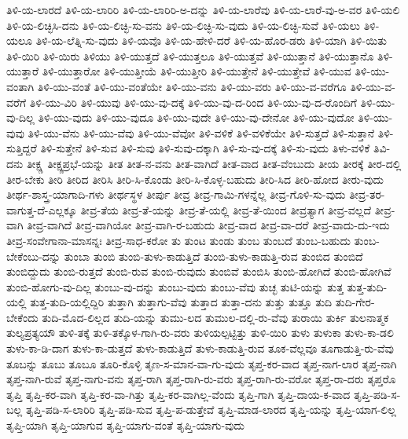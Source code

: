 {ತಿಳಿ-ಯ-ಲಾರದೆ
ತಿಳಿ-ಯ-ಲಾರಿರಿ
ತಿಳಿ-ಯ-ಲಾರಿರಿ-ಅ-ದನ್ನು
ತಿಳಿ-ಯ-ಲಾರೆವು
ತಿಳಿ-ಯ-ಲಾರೆ-ವು-ಅ-ವರ
ತಿಳಿ-ಯಲಿ
ತಿಳಿ-ಯ-ಲಿಚ್ಛಿಸಿ-ದನು
ತಿಳಿ-ಯ-ಲಿಚ್ಛಿ-ಸು-ವನು
ತಿಳಿ-ಯ-ಲಿಚ್ಛಿ-ಸು-ವುದು
ತಿಳಿ-ಯ-ಲಿಚ್ಛಿ-ಸುವೆ
ತಿಳಿ-ಯಲು
ತಿಳಿ-ಯಲೂ
ತಿಳಿ-ಯ-ಲೆತ್ನಿ-ಸು-ವುದು
ತಿಳಿ-ಯವೊ
ತಿಳಿ-ಯ-ಹೇಳಿ-ದರೆ
ತಿಳಿ-ಯ-ಹೊರ-ಡರು
ತಿಳಿ-ಯಾಗಿ
ತಿಳಿ-ಯಿತು
ತಿಳಿ-ಯಿರಿ
ತಿಳಿ-ಯಿರು
ತಿಳಿಯು
ತಿಳಿ-ಯುತ್ತದೆ
ತಿಳಿ-ಯುತ್ತಲೂ
ತಿಳಿ-ಯುತ್ತವೆ
ತಿಳಿ-ಯುತ್ತಾನೆ
ತಿಳಿ-ಯುತ್ತಾನೊ
ತಿಳಿ-ಯುತ್ತಾರೆ
ತಿಳಿ-ಯುತ್ತಾರೋ
ತಿಳಿ-ಯುತ್ತೀಯೆ
ತಿಳಿ-ಯುತ್ತೀರಿ
ತಿಳಿ-ಯುತ್ತೇನೆ
ತಿಳಿ-ಯುತ್ತೇವೆ
ತಿಳಿ-ಯುವ
ತಿಳಿ-ಯು-ವಂತಾಗಿ
ತಿಳಿ-ಯು-ವಂತೆ
ತಿಳಿ-ಯು-ವಂತೆಯೇ
ತಿಳಿ-ಯು-ವನು
ತಿಳಿ-ಯು-ವರು
ತಿಳಿ-ಯು-ವ-ವರೆಗೂ
ತಿಳಿ-ಯು-ವ-ವರೆಗೆ
ತಿಳಿ-ಯು-ವಿರಿ
ತಿಳಿ-ಯುವು
ತಿಳಿ-ಯು-ವು-ದಕ್ಕೆ
ತಿಳಿ-ಯು-ವು-ದ-ರಿಂದ
ತಿಳಿ-ಯು-ವು-ದ-ರೊಂದಿಗೆ
ತಿಳಿ-ಯು-ವು-ದಿಲ್ಲ
ತಿಳಿ-ಯು-ವುದು
ತಿಳಿ-ಯು-ವುದೂ
ತಿಳಿ-ಯು-ವುದೇ
ತಿಳಿ-ಯು-ವು-ದೇನೋ
ತಿಳಿ-ಯು-ವುದೋ
ತಿಳಿ-ಯು-ವುವು
ತಿಳಿ-ಯು-ವೆನು
ತಿಳಿ-ಯು-ವೆವು
ತಿಳಿ-ಯು-ವೆವೋ
ತಿಳಿ-ವಳಿಕೆ
ತಿಳಿ-ವಳಿಕೆಯೇ
ತಿಳಿ-ಸುತ್ತದೆ
ತಿಳಿ-ಸುತ್ತಾನೆ
ತಿಳಿ-ಸುತ್ತಿದ್ದರೆ
ತಿಳಿ-ಸುತ್ತೇನೆ
ತಿಳಿ-ಸುವ
ತಿಳಿ-ಸುವು
ತಿಳಿ-ಸುವು-ದಕ್ಕಾಗಿ
ತಿಳಿ-ಸು-ವು-ದಕ್ಕೆ
ತಿಳಿ-ಸು-ವುದು
ತಿಳು-ವಳಿಕೆ
ತಿವಿ-ದನು
ತೀಕ್ಷ್ಣ
ತೀಕ್ಷ್ಣಪ್ರಭೆ-ಯನ್ನು
ತೀತ
ತೀತ-ನ-ವನು
ತೀತ-ವಾಗಿದೆ
ತೀತ-ವಾದ
ತೀತ-ವೆಂಬುದು
ತೀಯ
ತೀರಕ್ಕೆ
ತೀರ-ದಲ್ಲಿ
ತೀರ-ಬೇಕು
ತೀರಿ
ತೀರಿದ
ತೀರಿಸಿ
ತೀರಿ-ಸಿ-ಕೊಂಡು
ತೀರಿ-ಸಿ-ಕೊಳ್ಳ-ಬಹುದು
ತೀರಿ-ಸಿದ
ತೀರಿ-ಹೋದ
ತೀರು-ವುದು
ತೀರ್ಥ-ಶಾಸ್ತ್ರ-ಯಾಗಾದಿ-ಗಳು
ತೀರ್ಥಸ್ಥಳ
ತೀರ್ಪು
ತೀವ್ರ
ತೀವ್ರ-ಗಾಮಿ-ಗಳನ್ನೆಲ್ಲ
ತೀವ್ರ-ಗೊಳಿ-ಸು-ವುದು
ತೀವ್ರ-ತರ-ವಾಗುತ್ತ-ದೆ-ಎಲ್ಲಕ್ಕೂ
ತೀವ್ರ-ತೆಯ
ತೀವ್ರ-ತೆ-ಯನ್ನು
ತೀವ್ರ-ತೆ-ಯಲ್ಲಿ
ತೀವ್ರ-ತೆ-ಯಿಂದ
ತೀವ್ರತ್ಯಾಗ
ತೀವ್ರ-ವಲ್ಲದೆ
ತೀವ್ರ-ವಾಗಿ
ತೀವ್ರ-ವಾಗಿದೆ
ತೀವ್ರ-ವಾಗಿಯೋ
ತೀವ್ರ-ವಾಗಿ-ರ-ಬಹುದು
ತೀವ್ರ-ವಾದ
ತೀವ್ರ-ವಾ-ದರೆ
ತೀವ್ರ-ವಾದು-ದು-ಇದು
ತೀವ್ರ-ಸಂವೇಗಾನಾ-ಮಾಸನ್ನಃ
ತೀವ್ರ-ಸಾಧ-ಕರೋ
ತು
ತುಂಟ
ತುಂಡು
ತುಂಬ
ತುಂಬದೆ
ತುಂಬ-ಬಹುದು
ತುಂಬ-ಬೇಕೆಂಬು-ದನ್ನು
ತುಂಬಾ
ತುಂಬಿ
ತುಂಬಿ-ತುಳು-ಕಾಡುತ್ತಿದೆ
ತುಂಬಿ-ತುಳು-ಕಾಡುತ್ತಿ-ರುವ
ತುಂಬಿದ
ತುಂಬಿದೆ
ತುಂಬಿದ್ದುದು
ತುಂಬಿ-ರುತ್ತದೆ
ತುಂಬಿ-ರುವ
ತುಂಬಿ-ರುವುದು
ತುಂಬಿವೆ
ತುಂಬಿಸಿ
ತುಂಬಿ-ಹೋಗಿದೆ
ತುಂಬಿ-ಹೋಗಿವೆ
ತುಂಬಿ-ಹೋಗು-ವು-ದಿಲ್ಲ
ತುಂಬು-ವು-ದನ್ನು
ತುಂಬು-ವುದು
ತುಂಬು-ವೆವು
ತುಚ್ಛ
ತುಟಿ-ಯನ್ನು
ತುತ್ತ
ತುತ್ತ-ತುದಿ-ಯಲ್ಲಿ
ತುತ್ತ-ತುದಿ-ಯಲ್ಲಿದ್ದಿರಿ
ತುತ್ತಾಗಿ
ತುತ್ತಾಗು-ವೆವು
ತುತ್ತಾದ
ತುತ್ತಾ-ದನು
ತುತ್ತು
ತುತ್ತೂ
ತುದಿ
ತುದಿ-ಗೇರ-ಬೇಕೆಂದು
ತುದಿ-ಮೊದ-ಲಿಲ್ಲದ
ತುದಿ-ಯನ್ನು
ತುಮು-ಲದ
ತುಮುಲ-ದಲ್ಲಿ-ರು-ವೆವು
ತುರಾಯಿ
ತುರ್ಕಿ
ತುಲನಾತ್ಮಕ
ತುಲ್ಯಪ್ರತ್ಯಯೌ
ತುಳಿ-ತಕ್ಕೆ
ತುಳಿ-ತಕ್ಕೊಳ-ಗಾಗಿ-ರು-ವರು
ತುಳಿಯಲ್ಪಟ್ಟಿತ್ತು
ತುಳಿ-ಯಿರಿ
ತುಳು
ತುಳುಕಾ
ತುಳು-ಕಾ-ಡಲಿ
ತುಳು-ಕಾ-ಡಿ-ದಾಗ
ತುಳು-ಕಾ-ಡುತ್ತದೆ
ತುಳು-ಕಾಡುತ್ತಿದೆ
ತುಳು-ಕಾಡುತ್ತಿ-ರುವ
ತೂಕ-ವೆಲ್ಲವೂ
ತೂಗಾಡುತ್ತಿ-ರು-ವೆವು
ತೂಬನ್ನು
ತೂಬು
ತೂಬೂ
ತೂರಿ-ಕೊಳ್ಳಿ
ತೃಣ-ಸ-ಮಾನ-ವಾ-ಗು-ವುದು
ತೃಪ್ತ-ಕರ-ವಾದ
ತೃಪ್ತ-ನಾಗ-ಲಾರ
ತೃಪ್ತ-ನಾಗಿ
ತೃಪ್ತ-ನಾಗಿ-ರುವೆ
ತೃಪ್ತ-ನಾಗು-ವನು
ತೃಪ್ತ-ರಾಗಿ
ತೃಪ್ತ-ರಾಗಿ-ರು-ವರು
ತೃಪ್ತ-ರಾಗಿ-ರು-ವರೋ
ತೃಪ್ತ-ರಾ-ದರು
ತೃಪ್ತರೊ
ತೃಪ್ತಿ
ತೃಪ್ತಿ-ಕರ-ವಾಗಿ
ತೃಪ್ತಿ-ಕರ-ವಾ-ಗಿತ್ತು
ತೃಪ್ತಿ-ಕರ-ವಾಗಿಲ್ಲ-ವೆಂದು
ತೃಪ್ತಿ-ಗಾಗಿ
ತೃಪ್ತಿ-ದಾಯ-ಕ-ವಾದ
ತೃಪ್ತಿ-ಪಡಿ-ಸ-ಬಲ್ಲ
ತೃಪ್ತಿ-ಪಡಿ-ಸ-ಲಾರಿರಿ
ತೃಪ್ತಿ-ಪಡಿ-ಸುವ
ತೃಪ್ತಿ-ಪ-ಡುತ್ತೇವೆ
ತೃಪ್ತಿ-ಮಾಡ-ಲಾರದ
ತೃಪ್ತಿ-ಯನ್ನು
ತೃಪ್ತಿ-ಯಾಗ-ಲಿಲ್ಲ
ತೃಪ್ತಿ-ಯಾಗಿ
ತೃಪ್ತಿ-ಯಾಗುವ
ತೃಪ್ತಿ-ಯಾಗು-ವಂತೆ
ತೃಪ್ತಿ-ಯಾಗು-ವುದು
}
